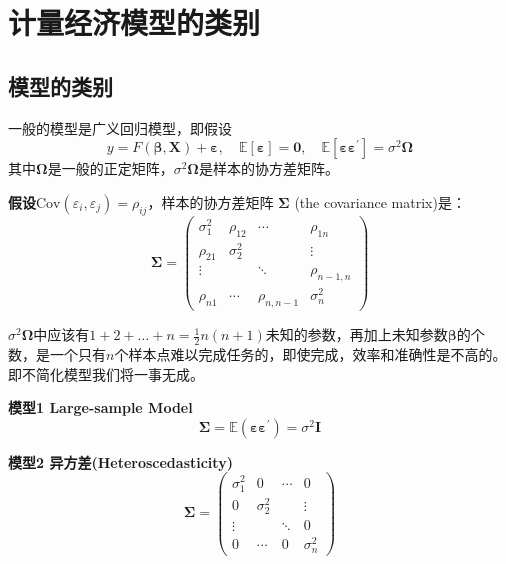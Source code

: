\chapter{计量经济模型的类别}

\section{模型的类别}
一般的模型是广义回归模型，即假设
$$ y=F(\boldsymbol{\beta}, \boldsymbol{X})+\boldsymbol{\varepsilon}, \quad \mathbb{E} [\boldsymbol{\varepsilon}]=\boldsymbol{0}, \quad \mathbb{E}\left[\boldsymbol{\varepsilon \varepsilon}^{\prime}\right]=\sigma^{2} \boldsymbol{\Omega} $$
其中$ \boldsymbol{\Omega} $是一般的正定矩阵，$ \sigma^{2}\boldsymbol{\Omega} $是样本的协方差矩阵。
	
{\bf{假设}}$ \mathrm{Cov}\left(\varepsilon_{i}, \varepsilon_{j}\right)
=\rho_{ij} $，样本的协方差矩阵 $  \boldsymbol{\Sigma } $ (the covariance matrix)是：
\begin{equation*}
	\boldsymbol{\Sigma} = \left(\begin{array}{cccc}
		\sigma_{1}^{2} & \rho_{12} & \cdots & \rho_{1 n} \\
		\rho_{21} & \sigma_{2}^{2} & & \vdots \\
		\vdots & & \ddots & \rho_{n-1, n} \\
		\rho_{n 1} & \cdots & \rho_{n, n-1} & \sigma_{n}^{2}
	\end{array}\right)
\end{equation*}

$ \sigma^{2}\boldsymbol{\Omega} $中应该有$ 1+2+\dots+n=\frac{1}{2}n(n+1) $未知的参数，再加上未知参数$ \boldsymbol{\beta} $的个数，是一个只有$ n $个样本点难以完成任务的，即使完成，效率和准确性是不高的。即不简化模型我们将一事无成。
	
\noindent \textbf{模型1 Large-sample Model}
$$ \boldsymbol{\Sigma} = \mathbb{E}\left(\boldsymbol{\varepsilon \varepsilon}^{\prime}\right)=\sigma^{2}\boldsymbol{I} $$
	
\noindent \textbf{模型2 异方差(Heteroscedasticity)}
\begin{equation*}
	\boldsymbol{\Sigma} = \left(\begin{array}{cccc}
		\sigma_{1}^{2} & 0 & \cdots & 0 \\
		0 & \sigma_{2}^{2} & & \vdots \\
		\vdots & & \ddots & 0 \\
		0 & \cdots & 0 & \sigma_{n}^{2}
	\end{array}\right)
\end{equation*}

